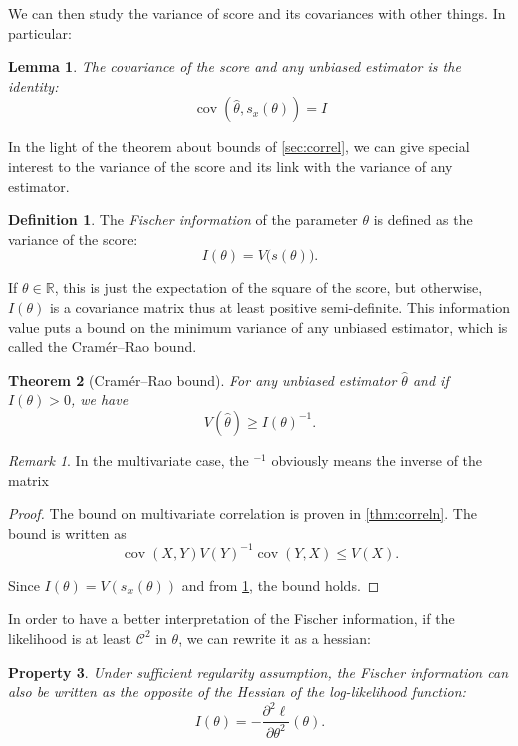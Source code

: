 \documentclass[10pt,a4paper]{report}
\theoremstyle{plain}
\newtheorem{thm}{Theorem}[chapter]
\newtheorem{prop}[thm]{Property}
\newtheorem{lem}[thm]{Lemma}
\theoremstyle{definition}
\newtheorem{defn}{Definition}[chapter]
\theoremstyle{remark}
\newtheorem*{rem}{Remark}
\newcommand{\R}{\ensuremath{\mathbb{R}}}
\renewcommand{\leq}{\leqslant}
\DeclareMathOperator{\cov}{cov}
\newcommand{\class}[1]{{\mathscr{C}^{#1}}}
\begin{document}
We can then study the variance of score and its covariances with other things.
In particular:

\begin{lem}\label{lem:corscr}
  The covariance of the score and any unbiased estimator is the identity:
  \[\cov(\hat \theta, s_x(\theta)) = I\]
\end{lem}


In the light of the theorem about bounds of \cref{sec:correl}, we can give special
interest to the variance of the score and its link with the variance of any estimator.

\begin{defn} The \emph{Fischer information} of the parameter $\theta$ is defined
  as the variance of the score:
  \[I(\theta) = V\big(s(\theta)\big).\]
\end{defn}

If $\theta \in \R$, this is just the expectation of the square of the score, but
otherwise, $I(\theta)$ is a covariance matrix thus at least positive
semi-definite.
This information value puts a bound on the minimum variance of any
unbiased estimator, which is called the Cramér–Rao bound.

\begin{thm}[Cramér–Rao bound]
  For any unbiased estimator $\hat \theta$ and if $I(\theta) > 0$, we have
  \[V(\hat{\theta}) \ge {I(\theta)}^{-1}.\]
\end{thm}

\begin{rem}
  In the multivariate case, the ${}^{-1}$ obviously means the inverse of the matrix
\end{rem}

\begin{proof}
  The bound on multivariate correlation is proven in \cref{thm:correln}. The
  bound is written as
  \[\cov(X,Y){V(Y)}^{-1}\cov(Y,X) \leq V(X).\]

Since $I(\theta) = V(s_x(\theta))$ and from \cref{lem:corscr}, the bound holds.
\end{proof}

In order to have a better interpretation of the Fischer information, if the
likelihood is at least $\class 2$ in $\theta$, we can rewrite
it as a hessian:

\begin{prop}\label{prop:fisherhessian}
  Under sufficient regularity assumption,
  the Fischer information can also be written as the opposite of the Hessian of the
  log-likelihood function:
  \[I(\theta) = -\frac{\partial^2 \ell}{\partial \theta^2}(\theta).\]
\end{prop}
\end{document}
